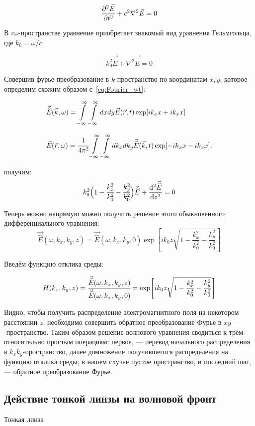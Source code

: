 \documentclass[14pt,a4paper]{extarticle}
\numberwithin{equation}{section}
\begin{document}
\begin{equation}
	\pdv[2]{\vec{E}}{t} + c^2 \nabla^2 \vec{E} = 0
\end{equation}

В  $r\omega$-пространстве уравнение приобретает знакомый вид уравнения Гельмгольца, где $k_0 = \omega/c$.

\begin{equation}
	k_0^2\vec{\widetilde{E}} + \nabla^2 \vec{\widetilde{E}} = 0
\end{equation}

Совершив фурье-преобразование в $k$-пространство по координатам $x,y$, которое определим схожим образом с~\ref{eq:Fourier_wt}:

\begin{equation}
	\label{eq:Fourier_rk}
		\begin{array}{lcl}
		\vec{\widehat{E}}(\vec{k}, \omega) = \displaystyle\int\limits_{-\infty}^{\infty}\int\limits_{-\infty}^{\infty} dxdy \vec{E}(\vec{r}, t)\exp[ik_xx + ik_xx]\\
		\\
		\vec{E}(\vec{r}, \omega) = \cfrac{1}{4\pi^2}\displaystyle\int\limits_{-\infty}^{\infty}\int\limits_{-\infty}^{\infty} dk_xdk_y \vec{\widehat{E}}(\vec{k}, t)\exp[-ik_xx - ik_xx],
	\end{array}
\end{equation}

получим: 
\begin{equation}
	k_0^2\Big(1 - \cfrac{k^2_x}{k^2_0} - \cfrac{k^2_y}{k^2_0} \Big)\vec{\widehat{E}} + \dv[2]{\vec{\widehat{E}}}{z} = 0
\end{equation}

Теперь можно напрямую можно получить решение этого обыкновенного дифференциального уравнения:
\begin{equation}
	\vec{\widehat{E}}(\omega, k_x, k_y, z) = \vec{\widehat{E}}(\omega, k_x, k_y, 0)\exp[ik_0z\sqrt{1 - \frac{k^2_x}{k^2_0} - \frac{k^2_y}{k^2_0}} ]
\end{equation}

Введём функцию отклика среды:

\begin{equation}
	H(k_x, k_y, z) = \cfrac{\vec{\widehat{E}}(\omega, k_x, k_y, z)}{\vec{\widehat{E}}(\omega, k_x, k_y, 0)} = \exp[ik_0z\sqrt{1 - \frac{k^2_x}{k^2_0} - \frac{k^2_y}{k^2_0}} ]
\end{equation}
 
Видно, чтобы получить распределение электромагнитного поля на некотором расстоянии $z$, необходимо совершить обратное преобразование Фурье в $xy$-пространство. Таким образом решение волнового уравнения сводиться к трём относительно простым операциям: первое, --- перевод начального распределения в $k_xk_y$-пространство, далее домножение получившегося распределения на функцию отклика среды, в нашем случае пустое пространство, и последний шаг, --- обратное преобразование Фурье. 

\subsection{Действие тонкой линзы на волновой фронт}
Тонкая линза 
\end{document}
